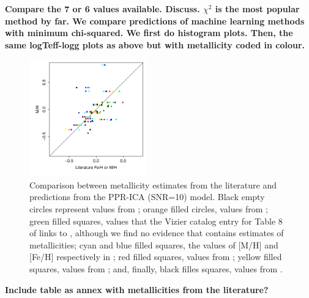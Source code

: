 %
%

{\bf Compare the 7 or 6 values available. Discuss.  $\chi^2$ is
  the most popular method by far. We compare predictions of machine
  learning methods with minimum chi-squared. We first do histogram
  plots. Then, the same logTeff-logg plots as above but with
  metallicity coded in colour.}

 \begin {figure}
  \centering
   \includegraphics[width=0.45\textwidth]{figs/irtf-figs/M-ICA10.pdf}
   \caption{Comparison between metallicity estimates from the
     literature and predictions from the PPR-ICA (SNR=10) model. 
     Black empty circles represent values from \cite{cesetti}
     ; orange filled circles, values from \cite{NevesIII};  green filled 
     squares, values that the Vizier catalog entry for Table 8 of 
     \cite{NevesIII} links to \cite{Jao}, although we find no evidence that \cite{Jao} 
     contains estimates of metallicities; cyan and blue filled squares, the values 
     of [M/H] and [Fe/H] respectively in \cite{RA2012}; red filled squares, values 
     from \cite{Mann2015}; yellow filled squares,  values from \cite{Newton2014}; and, 
     finally, black filles squares, values from \cite{Gaidos2015}.}
  \label{MIRTF_ICA_10}
 \end {figure}

 {\bf Include table as annex with metallicities from the literature?}
